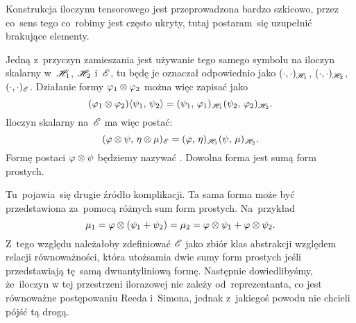 \documentclass[a4paper,11pt]{article}
\begin{document}
\vspace{\spaceFour}



\start {} Konstrukcja iloczynu tensorowego jest przeprowadzona
bardzo szkicowo, przez co~sens tego co~robimy jest często ukryty,
tutaj postaram~się uzupełnić brakujące elementy.


Jedną z~przyczyn zamieszania jest używanie tego samego symbolu na
iloczyn skalarny w~$\mathcal{H}_{ 1 }$, $\mathcal{H}_{ 2 }$ i~$\mathcal{E}$, tu będę je
oznaczał odpowiednio jako $( \cdot, \cdot )_{ \mathcal{H}_{ 1 } }$,
$( \cdot, \cdot )_{ \mathcal{H}_{ 2 } }$, $( \cdot, \cdot )_{ \mathcal{ E } }$.
Działanie formy $\varphi_{ 1 } \otimes \varphi_{ 2 }$ można więc zapisać jako
\begin{equation*}
  ( \varphi_{ 1 } \otimes \varphi_{ 2 } )\langle  \psi_{ 1 }, \,  \psi_{ 2 }  \rangle
  = (  \psi_{ 1 } , \,  \varphi_{ 1 }  )_{ \mathcal{H}_{ 1 } } (  \psi_{ 2 } , \,  \varphi_{ 2 }  )_{ \mathcal{H}_{ 2 } }.
\end{equation*}
Iloczyn skalarny na~$\mathcal{E}$ ma więc postać:
\begin{equation*}
  (  \varphi \otimes \psi , \,  \eta \otimes \mu  )_{ \mathcal{E} }
  = (  \varphi , \,  \eta  )_{ \mathcal{H}_{ 1 } } (  \psi , \,  \mu  )_{ \mathcal{H}_{ 2 } }.
\end{equation*}
Formę postaci $\varphi \otimes \psi$ będziemy nazywać .
Dowolna forma jest sumą form prostych.

Tu~pojawia~się drugie źródło komplikacji. Ta sama forma może być
przedstawiona za~pomocą różnych sum form prostych. Na~przykład
\begin{equation*}
  \mu_{ 1 } = \varphi \otimes ( \psi_{ 1 } + \psi_{ 2 } ) = \mu_{ 2 }
  = \varphi \otimes \psi_{ 1 } + \varphi \otimes \psi_{ 2 }.
\end{equation*}
Z~tego względu należałoby zdefiniować $\mathcal{E}$ jako zbiór klas
abstrakcji względem relacji równoważności, która utożsamia dwie sumy
form prostych jeśli przedstawiają tę~samą dwuantyliniową formę.
Następnie dowiedlibyśmy, że~iloczyn w tej przestrzeni ilorazowej nie
zależy od~reprezentanta, co jest równoważne postępowaniu Reeda
i~Simona, jednak z~jakiegoś powodu nie chcieli pójść tą drogą.
\end{document}
